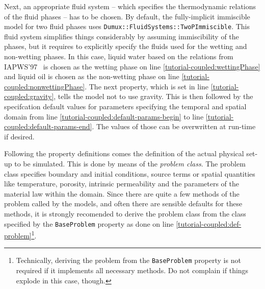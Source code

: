 Next, an appropriate fluid system -- which specifies the thermodynamic
relations of the fluid phases -- has to be chosen. By default, the
fully-implicit immiscible model for two fluid phases uses
\texttt{Dumux::FluidSystems::TwoPImmiscible}. This fluid system
simplifies things considerably by assuming immiscibility of the
phases, but it requires to explicitly specify the fluids used for the
wetting and non-wetting phases. In this case, liquid water based on
the relations from IAPWS'97~\cite{IAPWS1997} is chosen as the wetting
phase on line \ref{tutorial-coupled:wettingPhase} and liquid oil is
chosen as the non-wetting phase on line
\ref{tutorial-coupled:nonwettingPhase}. The next property, which is
set in line \ref{tutorial-coupled:gravity}, tells the model not to use
gravity. This is then followed by the specifcation default values for
parameters specifying the temporal and spatial domain from line
\ref{tutorial-coupled:default-params-begin} to line
\ref{tutorial-coupled:default-params-end}.  The values of those can be
overwritten at run-time if desired.

Following the property definitions comes the definition of the actual
physical set-up to be simulated. This is done by means of the
\textit{problem class}. The problem class specifies boundary and
initial conditions, source terms or spatial quantities like
temperature, porosity, intrinsic permeability and the parameters of
the material law within the domain. Since there are quite a few
methods of the problem called by the \eWoms models, and often there
are sensible defaults for these methods, it is strongly recomended to
derive the problem class from the class specified by the
\texttt{BaseProblem} property as done on line
\ref{tutorial-coupled:def-problem}\footnote{Technically, deriving the
  problem from the \texttt{BaseProblem} property is not required if it
  implements all necessary methods. Do not complain if things explode
  in this case, though.}.

